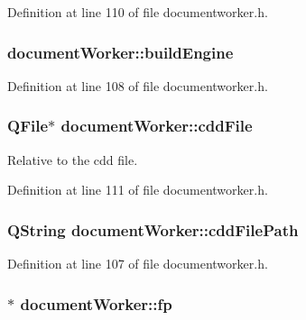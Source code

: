 Definition at line 110 of file documentworker.\+h.

\hypertarget{classdocument_worker_ab5c27d8e6fd6d96d881d84259dc3538a}{
\subsubsection[{build\+Engine}]{ document\+Worker\+::build\+Engine\hspace{0.3cm}{\ttfamily [private]}}}\label{classdocument_worker_ab5c27d8e6fd6d96d881d84259dc3538a}


Definition at line 108 of file documentworker.\+h.

\hypertarget{classdocument_worker_ae5dabdc7bbf00675b9a2ed4541e43d63}{
\subsubsection[{cdd\+File}]{\setlength{\rightskip}{0pt plus 5cm}Q\+File$\ast$ document\+Worker\+::cdd\+File\hspace{0.3cm}{\ttfamily [private]}}}\label{classdocument_worker_ae5dabdc7bbf00675b9a2ed4541e43d63}


Relative to the cdd file. 



Definition at line 111 of file documentworker.\+h.

\hypertarget{classdocument_worker_ad2f131c1430b72e3eab8b5cc9a6e920e}{
\subsubsection[{cdd\+File\+Path}]{\setlength{\rightskip}{0pt plus 5cm}Q\+String document\+Worker\+::cdd\+File\+Path\hspace{0.3cm}{\ttfamily [private]}}}\label{classdocument_worker_ad2f131c1430b72e3eab8b5cc9a6e920e}


Definition at line 107 of file documentworker.\+h.

\hypertarget{classdocument_worker_a1825443dff2970960623c0b1979ce85f}{
\subsubsection[{fp}]{$\ast$ document\+Worker\+::fp\hspace{0.3cm}{\ttfamily [private]}}}\label{classdocument_worker_a1825443dff2970960623c0b1979ce85f}


